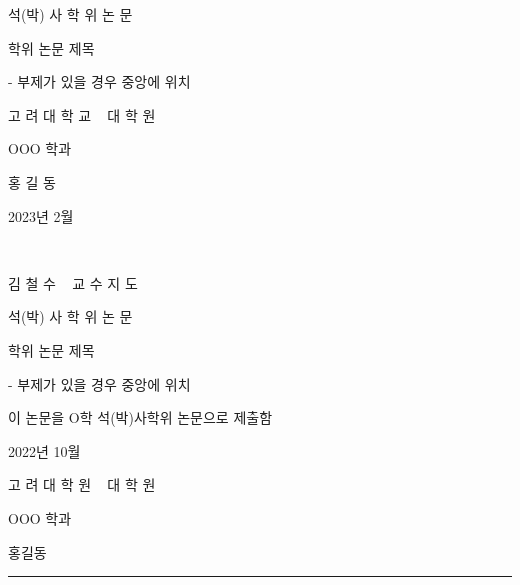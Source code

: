 \documentclass[11pt]{report}
\numberwithin{figure}{section}
\theoremstyle{plain}
\theoremstyle{definition}
\theoremstyle{corollary}
\theoremstyle{definition}
\theoremstyle{plain}
\theoremstyle{definition}
\theoremstyle{plain}
\begin{document}
\onehalfspacing
\renewcommand{\arraystretch}{1.5}

\newpage
\centering
{} %
\Large 석(박) 사 학 위 논 문
\par\vspace{3cm} %
\huge 학위 논문 제목
\par\vspace{0.3cm}\Large - 부제가 있을 경우 중앙에 위치
\par\vspace{4.7cm} %
\LARGE 고 려 대 학 교 ~ 대 학 원
\par\vspace{0.5cm}
\Large OOO 학과
\par\vspace{0.5cm}
\Large 홍 길 동
\par\vspace{3cm}
\large 2023년 2월

\newpage
~


\newpage
\Large 김 철 수 ~ 교 수 지 도
\par\vspace{0.5cm}
\Large 석(박) 사 학 위 논 문
\par\vspace{2cm}
\huge 학위 논문 제목
\par\vspace{0.3cm}\Large - 부제가 있을 경우 중앙에 위치
\par\vspace{2cm} %
\Large 이 논문을 O학 석(박)사학위 논문으로 제출함
\par\vspace{2cm}
\large 2022년 10월
\par\vspace{2cm}
\LARGE 고 려 대 학 원 ~ 대 학 원
\par\vspace{0.5cm}
\Large OOO 학과
\par\vspace{1cm}
\Large 홍길동
\par\vspace{1.0cm}
\rule{.6\textwidth}{0.4pt} %
\end{document}
